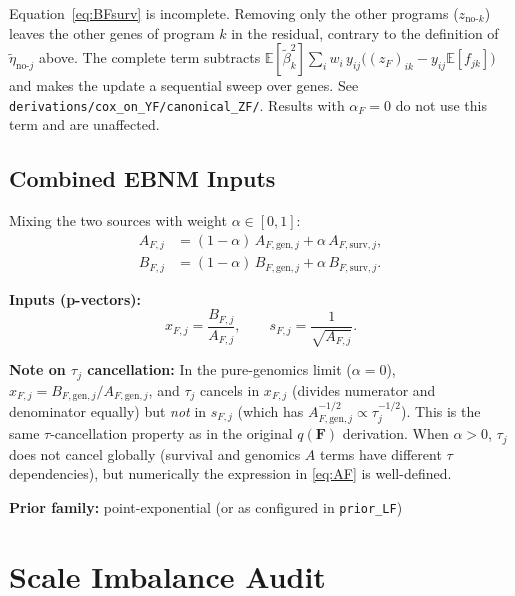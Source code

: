 \documentclass[11pt]{article}
\newcommand{\E}{\mathbb{E}}
\begin{document}
\begin{correctionbox}[Correction (2026-10-15)]
Equation~\eqref{eq:BFsurv} is incomplete. Removing only the other programs ($z_{\text{no-}k}$)
leaves the other genes of program $k$ in the residual, contrary to the definition of
$\tilde\eta_{\text{no-}j}$ above. The complete term subtracts
$\E[\tilde\beta_k^2]\sum_i w_i\,y_{ij}\bigl((z_F)_{ik}-y_{ij}\E[f_{jk}]\bigr)$ and makes the update a
sequential sweep over genes. See \texttt{derivations/cox\_on\_YF/canonical\_ZF/}. Results with
$\alpha_F = 0$ do not use this term and are unaffected.
\end{correctionbox}

\subsection{Combined EBNM Inputs}

Mixing the two sources with weight $\alpha \in [0,1]$:
\begin{align}
  A_{F,j} &= (1-\alpha)\,A_{F,\text{gen},j} + \alpha\,A_{F,\text{surv},j}, \label{eq:AF}\\
  B_{F,j} &= (1-\alpha)\,B_{F,\text{gen},j} + \alpha\,B_{F,\text{surv},j}. \label{eq:BF}
\end{align}

\begin{ebnmbox}
\textbf{Inputs (p-vectors):}
\[
  x_{F,j} = \frac{B_{F,j}}{A_{F,j}}, \qquad
  s_{F,j} = \frac{1}{\sqrt{A_{F,j}}}.
\]

\textbf{Note on $\tau_j$ cancellation:} In the pure-genomics limit ($\alpha=0$),
$x_{F,j} = B_{F,\text{gen},j}/A_{F,\text{gen},j}$, and $\tau_j$ cancels in $x_{F,j}$
(divides numerator and denominator equally) but \emph{not} in $s_{F,j}$
(which has $A_{F,\text{gen},j}^{-1/2} \propto \tau_j^{-1/2}$). This is the same
$\tau$-cancellation property as in the original $q(\mathbf{F})$ derivation. When $\alpha > 0$,
$\tau_j$ does not cancel globally (survival and genomics $A$ terms have different $\tau$ dependencies),
but numerically the expression in \eqref{eq:AF} is well-defined.

\vspace{6pt}
\textbf{Prior family:} point-exponential (or as configured in \texttt{prior\_LF})
\end{ebnmbox}

\section{Scale Imbalance Audit}
\end{document}
